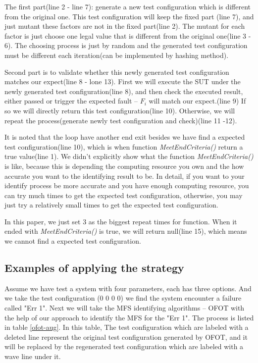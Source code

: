 \documentclass{sig-alternate}
\begin{document}
The first part(line 2 - line 7): generate a new test configuration which is different from the original one. This test configuration will keep the fixed part (line 7), and just mutant these factors are not in the fixed part(line 2). The mutant for each factor is just choose one legal value that is different from the original one(line 3 - 6). The choosing process is just by random and the generated test configuration must be different each iteration(can be implemented by hashing method).

Second part is to validate whether this newly generated test configuration matches our expect(line 8 - lone 13). First we will execute the SUT under the newly generated test configuration(line 8), and then check the executed result, either passed or trigger the expected fault -- $F_{i}$ will match our expect.(line 9) If so we will directly return this test configuration(line 10). Otherwise, we will repeat the process(generate newly test configuration and check)(line 11 -12).

It is noted that the loop have another end exit besides we have find a expected test configuration(line 10), which is when function \emph{MeetEndCriteria()} return a true value(line 1). We didn't explicitly show what the function \emph{MeetEndCriteria()} is like, because this is depending the computing resource you own and the how accurate you want to the identifying result to be. In detail, if you want to your identify process be more accurate and you have enough computing resource, you can try much times to get the expected test configuration, otherwise, you may just try a relatively small times to get the expected test configuration.

In this paper, we just set 3 as the biggest repeat times for function. When it ended with \emph{MeetEndCriteria()} is true, we will return null(line 15), which means we cannot find a expected test configuration.

\subsection{Examples of applying the strategy}

Assume we have test a system with four parameters, each has three options. And we take the test configuration (0 0 0 0) we find the system encounter a failure called "Err 1". Next we will take the MFS identifying algorithms -- OFOT with the help of our approach to identify the MFS for the "Err 1". The process is listed in table \ref{ofot-aug}. In this table, The test configuration which are labeled with a deleted line represent the original test configuration generated by OFOT, and it will be replaced by the regenerated test configuration which are labeled with a wave line under it.
\end{document}
